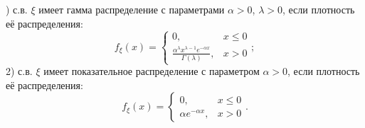 \begin{problem}
) с.в. $\xi $ имеет гамма распределение с параметрами $\alpha >0$, $\lambda >0$, если плотность её распределения:
\[f_{\xi } (x)=\left\{\begin{array}{cc} {0,} & {x\le 0} \\ {\frac{\alpha ^{\lambda } x^{\lambda -1} e^{-\alpha x} }{\Gamma (\lambda )} ,} & {x>0} \end{array}\right. ;\] 
2) с.в. $\xi $ имеет показательное распределение с параметром $\alpha >0$, если плотность её распределения:
\[f_{\xi } (x)=\left\{\begin{array}{cc} {0,} & {x\le 0} \\ {\alpha e^{-\alpha x} ,} & {x>0} \end{array}\right. .\] 
\end{problem}
